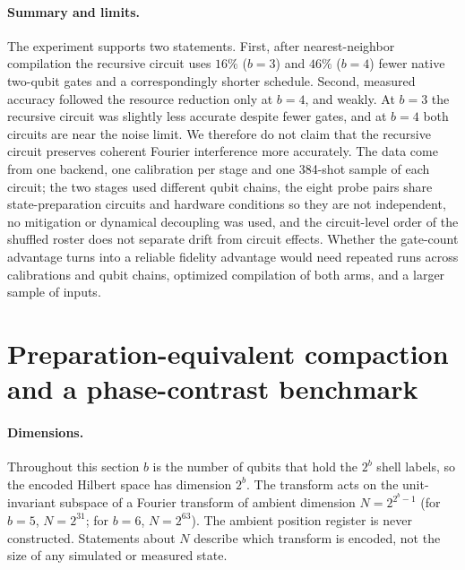 \documentclass[11pt]{article}
\begin{document}
\paragraph{Summary and limits.} The experiment supports two statements. First, after nearest-neighbor compilation the recursive circuit uses $16\%$ ($b=3$) and $46\%$ ($b=4$) fewer native two-qubit gates and a correspondingly shorter schedule. Second, measured accuracy followed the resource reduction only at $b=4$, and weakly. At $b=3$ the recursive circuit was slightly less accurate despite fewer gates, and at $b=4$ both circuits are near the noise limit. We therefore do not claim that the recursive circuit preserves coherent Fourier interference more accurately. The data come from one backend, one calibration per stage and one 384-shot sample of each circuit; the two stages used different qubit chains, the eight probe pairs share state-preparation circuits and hardware conditions so they are not independent, no mitigation or dynamical decoupling was used, and the circuit-level order of the shuffled roster does not separate drift from circuit effects. Whether the gate-count advantage turns into a reliable fidelity advantage would need repeated runs across calibrations and qubit chains, optimized compilation of both arms, and a larger sample of inputs.

\section{Preparation-equivalent compaction and a phase-contrast benchmark}\label{sec:compact}
\paragraph{Dimensions.} Throughout this section $b$ is the number of qubits that hold the $2^b$ shell labels, so the encoded Hilbert space has dimension $2^b$. The transform acts on the unit-invariant subspace of a Fourier transform of ambient dimension $N=2^{2^b-1}$ (for $b=5$, $N=2^{31}$; for $b=6$, $N=2^{63}$). The ambient position register is never constructed. Statements about $N$ describe which transform is encoded, not the size of any simulated or measured state.
\end{document}
